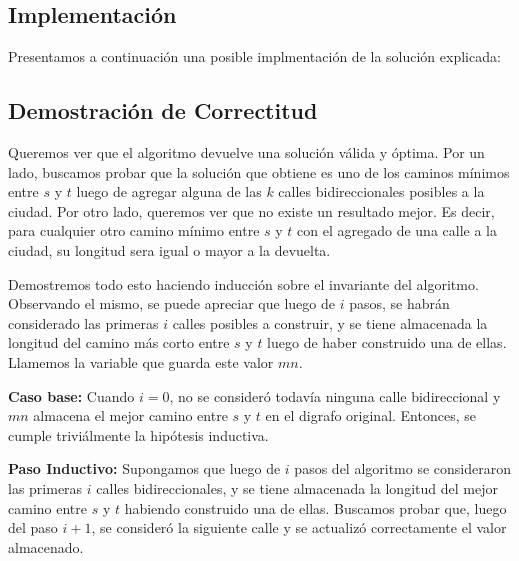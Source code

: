 \subsection{Implementación}
\vspace{1em}

Presentamos a continuación una posible implmentación de la solución explicada:



\subsection{Demostración de Correctitud}
\vspace{1em}

Queremos ver que el algoritmo devuelve una solución válida y óptima. Por un lado, buscamos probar que la solución que obtiene es uno de los caminos mínimos entre $s$ y $t$ luego de agregar alguna de las $k$ calles bidireccionales posibles a la ciudad. Por otro lado, queremos ver que no existe un resultado mejor. Es decir, para cualquier otro camino mínimo entre $s$ y $t$ con el agregado de una calle a la ciudad, su longitud sera igual o mayor a la devuelta.

\vspace{1em}

Demostremos todo esto haciendo inducción sobre el invariante del algoritmo. Observando el mismo, se puede apreciar que luego de $i$ pasos, se habrán considerado las primeras $i$ calles posibles a construir, y se tiene almacenada la longitud del camino más corto entre $s$ y $t$ luego de haber construido una de ellas. Llamemos la variable que guarda este valor $mn$. 

\vspace{1em}

\textbf{Caso base:} Cuando $i = 0$, no se consideró todavía ninguna calle bidireccional y $mn$ almacena el mejor camino entre $s$ y $t$ en el digrafo original. Entonces, se cumple triviálmente la hipótesis inductiva.

\vspace{1em}

\textbf{Paso Inductivo:} Supongamos que luego de $i$ pasos del algoritmo se consideraron las primeras $i$ calles bidireccionales, y se tiene almacenada la longitud del mejor camino entre $s$ y $t$ habiendo construido una de ellas. Buscamos probar que, luego del paso $i+1$, se consideró la siguiente calle y se actualizó correctamente el valor almacenado.

